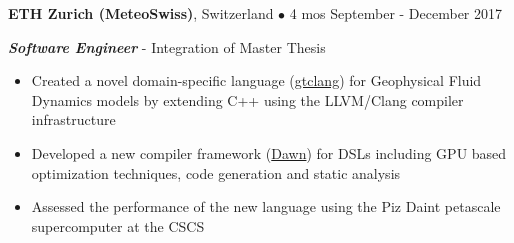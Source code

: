 \textbf{ETH Zurich (MeteoSwiss)}, Switzerland $\bullet$ 4 mos \hfill September - December 2017

\textbf{\textit{Software Engineer}} - Integration of Master Thesis
\begin{itemize}
    \item Created a novel domain-specific language (\href{https://github.com/MeteoSwiss-APN/gtclang}{gtclang}) for Geophysical Fluid Dynamics models by extending C++ using the LLVM/Clang compiler infrastructure
	\item Developed a new compiler framework (\href{https://github.com/MeteoSwiss-APN/dawn}{Dawn}) for DSLs including GPU based optimization techniques, code generation and static analysis
	\item Assessed the performance of the new language using the Piz Daint petascale supercomputer at the CSCS
\end{itemize}
